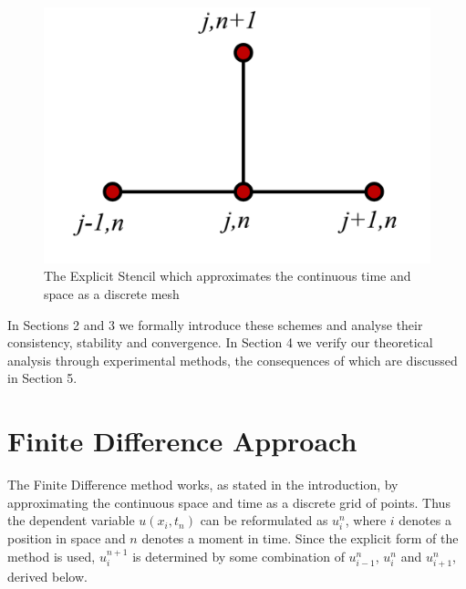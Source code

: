 \documentclass[a4paper]{article}
\begin{document}
\begin{figure}[H]
    \includegraphics[scale=0.2]{Stencil.png}
    \caption{The Explicit Stencil which approximates the continuous time and space as a discrete mesh}
    \label{fig:stencil}
\end{figure}
In Sections 2 and 3 we formally introduce these schemes and analyse their consistency, stability and convergence. In Section 4 we verify our theoretical analysis through experimental methods, the consequences of which are discussed in Section 5.
\section{Finite Difference Approach}\label{sec:FDM}
    The Finite Difference method works, as stated in the introduction, by approximating the continuous space and time as a discrete grid of points. Thus the dependent variable $u(x_{i},t_{n})$ can be reformulated as $u_{i}^{n}$, where $i$ denotes a position in space and $n$ denotes a moment in time.
    \newline
    Since the explicit form of the method is used, $u_{i}^{n+1}$ is determined by some combination of $u_{i-1}^{n}$, $u_{i}^{n}$ and $u_{i+1}^{n}$, derived below.
\end{document}
